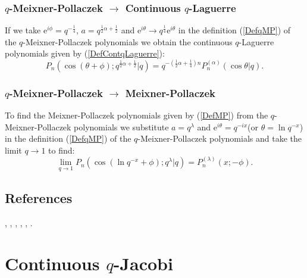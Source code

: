 \documentclass[envcountchap,graybox]{svmono}
\newcounter{rom}
\newcommand{\e}{\textrm{e}}
\begin{document}
\subsubsection*{$q$-Meixner-Pollaczek $\rightarrow$ Continuous
$q$-Laguerre}
If we take $\e^{i\phi}=q^{-\frac{1}{4}}$, $a=q^{\frac{1}{2}\alpha+\frac{1}{2}}$
and $\e^{i\theta}\rightarrow q^{\frac{1}{4}}\e^{i\theta}$ in the definition
(\ref{DefqMP}) of the $q$-Meixner-Pollaczek polynomials we obtain the
continuous $q$-Laguerre polynomials given by (\ref{DefContqLaguerre}):
\begin{equation}
P_n(\cos(\theta+\phi);q^{\frac{1}{2}\alpha+\frac{1}{2}}|q)=
q^{-(\frac{1}{2}\alpha+\frac{1}{4})n}P_n^{(\alpha)}(\cos\theta|q).
\end{equation}

\subsubsection*{$q$-Meixner-Pollaczek $\rightarrow$ Meixner-Pollaczek}
To find the Meixner-Pollaczek polynomials given by (\ref{DefMP}) from the $q$-Meixner-Pollaczek
polynomials we substitute $a=q^{\lambda}$ and $\e^{i\theta}=q^{-ix}$(or $\theta=\ln q^{-x}$) in the definition
(\ref{DefqMP}) of the $q$-Meixner-Pollaczek polynomials and take the limit $q\rightarrow 1$ to find:
\begin{equation}
\lim_{q\rightarrow 1}P_n(\cos(\ln q^{-x}+\phi);q^{\lambda}|q)
=P_n^{(\lambda)}(x;-\phi).
\end{equation}

\subsection*{References}
\cite{AlSalam90}, \cite{AlSalamChihara87}, \cite{AskeyIsmail84},
\cite{AskeyWilson85}, \cite{CharrisIsmail}, \cite{Ismail85II}.


\section{Continuous $q$-Jacobi}
\par\setcounter{equation}{0}
\end{document}
